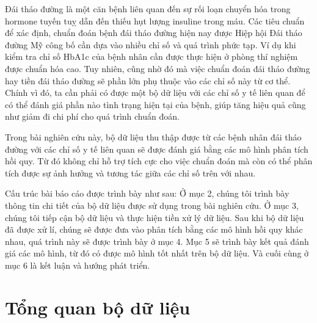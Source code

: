 \documentclass[runningheads]{llncs}
\begin{document}
Đái tháo đường là một căn bệnh liên quan đến sự rối loạn chuyển hóa trong hormone tuyến tuỵ dẫn đến thiếu hụt lượng insuline trong máu. Các tiêu chuẩn để xác định, chuẩn đoán bệnh đái tháo đường hiện nay được Hiệp hội Đái tháo đường Mỹ công bố cần dựa vào nhiều chỉ số và quá trình phức tạp. Ví dụ khi kiểm tra chỉ số HbA1c của bệnh nhân cần được thực hiện ở phòng thí nghiệm được chuẩn hóa cao. Tuy nhiên, cũng nhờ đó mà việc chuẩn đoán đái tháo đường hay tiền đái tháo đường sẽ phần lớn phụ thuộc vào các chỉ số này từ cơ thể. 
Chính vì đó, ta cần phải có được một bộ dữ liệu với các chỉ số y tế liên quan để có thể đánh giá phần nào tình trạng hiện tại của bệnh, giúp tăng hiệu quả cũng như giảm đi chi phí cho quá trình chuẩn đoán. 

Trong bài nghiên cứu này, bộ dữ liệu thu thập được từ các bệnh nhân đái tháo đường với các chỉ số y tế liên quan sẽ được đánh giá bằng các mô hình phân tích hồi quy. Từ đó không chỉ hỗ trợ tích cực cho việc chuẩn đoán mà còn có thể phân tích được sự ảnh hưởng và tương tác giữa các chỉ số trên với nhau.

Cấu trúc bài báo cáo được trình bày như sau: Ở mục 2, chúng tôi trình bày thông tin chi tiết của bộ dữ liệu được sử dụng trong bài nghiên cứu. Ở mục 3, chúng tôi tiếp cận bộ dữ liệu và thực hiện tiền xử lý dữ liệu. Sau khi bộ dữ liệu đã được xử lí, chúng sẽ được đưa vào phân tích bằng các mô hình hồi quy khác nhau, quá trình này sẽ được trình bày ở mục 4. Mục 5 sẽ trình bày kết quả đánh giá các mô hình, từ đó có được mô hình tốt nhất trên bộ dữ liệu. Và cuối cùng ở mục 6 là kết luận và hướng phát triển.

\section{Tổng quan bộ dữ liệu}
\end{document}
